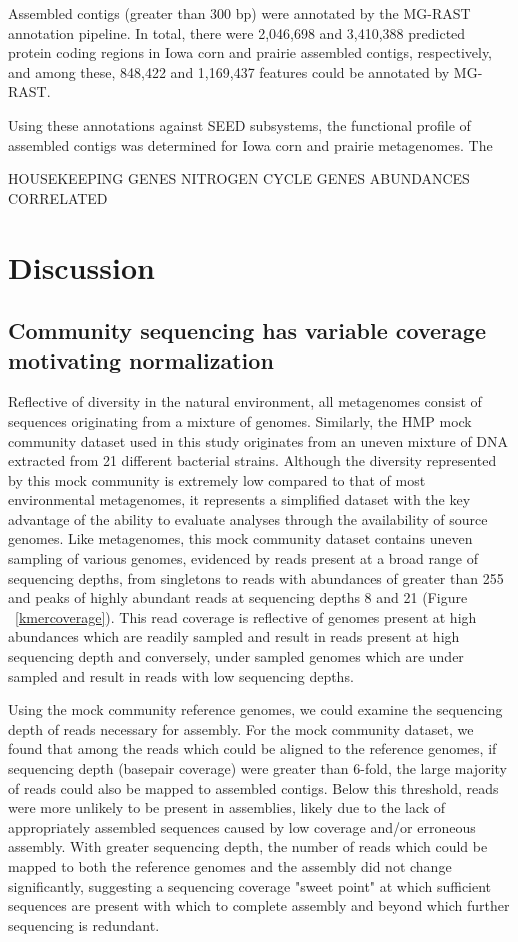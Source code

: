 \documentclass[11pt]{article} %
\begin{document}
	Assembled contigs (greater than 300 bp) were annotated by the MG-RAST annotation pipeline.  In total, there were 2,046,698 and 3,410,388 predicted protein coding regions in Iowa corn and prairie assembled contigs, respectively, and among these, 848,422 and 1,169,437 features could be annotated by MG-RAST.   
	
	
	
	
	Using these annotations against SEED subsystems, the functional profile of assembled contigs was determined for Iowa corn and prairie metagenomes.  The 

HOUSEKEEPING GENES
NITROGEN CYCLE GENES
ABUNDANCES CORRELATED

\section{Discussion}

\subsection{Community sequencing has variable coverage motivating normalization} 

Reflective of diversity in the natural environment, all metagenomes consist of sequences originating from a mixture of genomes.  Similarly, the HMP mock community dataset used in this study originates from an uneven mixture of DNA extracted from 21 different bacterial strains.  Although the diversity represented by this mock community is extremely low compared to that of most environmental metagenomes, it represents a simplified dataset with the key advantage of the ability to evaluate analyses through the availability of source genomes.  Like metagenomes, this mock community dataset contains uneven sampling of various genomes, evidenced by reads present at a broad range of sequencing depths, from singletons to reads with abundances of greater than 255 and peaks of highly abundant reads at sequencing depths 8 and 21 (Figure ~\ref{kmercoverage}).   This read coverage is reflective of genomes present at high abundances which are readily sampled and result in reads present at high sequencing depth and conversely, under sampled genomes which are under sampled and result in reads with low sequencing depths.  

Using the mock community reference genomes, we could examine the sequencing depth of reads necessary for assembly.  For the mock community dataset, we found that among the reads which could be aligned to the reference genomes, if sequencing depth (basepair coverage) were greater than 6-fold, the large majority of reads could also be mapped to assembled contigs.  Below this threshold, reads were more unlikely to be present in assemblies, likely due to the lack of appropriately assembled sequences caused by low coverage and/or erroneous assembly.  With greater sequencing depth, the number of reads which could be mapped to both the reference genomes and the assembly did not change significantly, suggesting a sequencing coverage "sweet point" at which sufficient sequences are present with which to complete assembly and beyond which further sequencing is redundant.  
\end{document}
